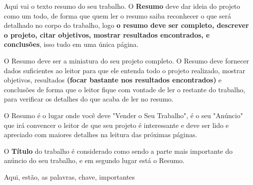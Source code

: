 \clearpage\newpage\pagebreak%
\pagestyle{plain}

\Resumo 

Aqui vai o texto resumo do seu trabalho. 
O {\bf Resumo} deve dar ideia do projeto como um todo, de forma que quem ler o resumo saiba reconhecer o que será detalhado no corpo do trabalho, logo {\bf o resumo deve ser completo, descrever o projeto, citar objetivos, mostrar resultados encontrados, e conclusões}, isso tudo em uma única página.
    
O Resumo deve ser a miniatura do seu projeto completo. O Resumo deve fornecer dados suficientes ao leitor para que ele entenda todo o projeto realizado, mostrar objetivos, resultados {\bf (focar bastante nos resultados encontrados)} e conclusões de forma que o leitor fique com vontade de ler o restante do trabalho, para verificar os detalhes do que acaba de ler no resumo.

O Resumo é o lugar onde você deve "Vender o Seu Trabalho", é o seu "Anúncio" que irá convencer o leitor de que seu projeto é interessante e deve ser lido e apreciado com maiores detalhes na leitura das próximas páginas.
    
O {\bf Título} do trabalho é considerado como sendo a parte mais importante do anúncio do seu trabalho, e em segundo lugar está o Resumo.

\begin{keywords}
Aqui, estão, as palavras, chave, importantes
\end{keywords}